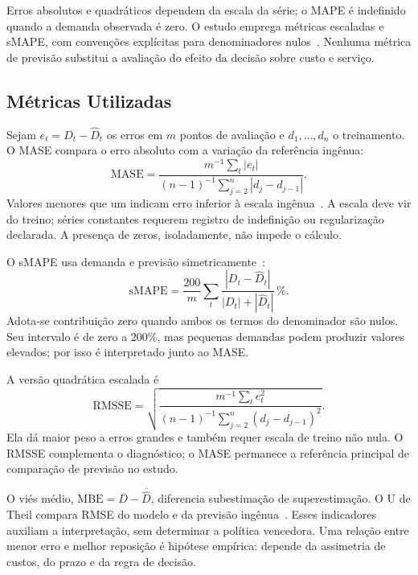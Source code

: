 Erros absolutos e quadráticos dependem da escala da série; o MAPE é indefinido quando a demanda observada é zero. O estudo emprega métricas escaladas e sMAPE, com convenções explícitas para denominadores nulos~\citep{Hyndman2006MASE,Makridakis2020M4Competition}. Nenhuma métrica de previsão substitui a avaliação do efeito da decisão sobre custo e serviço.

\subsection{Métricas Utilizadas}

Sejam $e_t=D_t-\hat D_t$ os erros em $m$ pontos de avaliação e $d_1,\ldots,d_n$ o treinamento. O MASE compara o erro absoluto com a variação da referência ingênua:
\begin{equation}
\mathrm{MASE}=\frac{m^{-1}\sum_t|e_t|}{(n-1)^{-1}\sum_{j=2}^{n}|d_j-d_{j-1}|}.
\label{eq:mase}
\end{equation}
Valores menores que um indicam erro inferior à escala ingênua~\citep{Hyndman2006MASE}. A escala deve vir do treino; séries constantes requerem registro de indefinição ou regularização declarada. A presença de zeros, isoladamente, não impede o cálculo.

O sMAPE usa demanda e previsão simetricamente~\citep{Makridakis1993SMAPE}:
\begin{equation}
\mathrm{sMAPE}=\frac{200}{m}\sum_t\frac{|D_t-\hat D_t|}{|D_t|+|\hat D_t|}\,\%.
\label{eq:smape}
\end{equation}
Adota-se contribuição zero quando ambos os termos do denominador são nulos. Seu intervalo é de zero a 200\%, mas pequenas demandas podem produzir valores elevados; por isso é interpretado junto ao MASE.

A versão quadrática escalada é
\begin{equation}
\mathrm{RMSSE}=\sqrt{\frac{m^{-1}\sum_te_t^2}{(n-1)^{-1}\sum_{j=2}^{n}(d_j-d_{j-1})^2}}.
\label{eq:rmsse}
\end{equation}
Ela dá maior peso a erros grandes e também requer escala de treino não nula. O RMSSE complementa o diagnóstico; o MASE permanece a referência principal de comparação de previsão no estudo.

O viés médio, $\mathrm{MBE}=\overline D-\overline{\hat D}$, diferencia subestimação de superestimação. O U de Theil compara RMSE do modelo e da previsão ingênua~\citep{Theil1966AppliedEconometrics}. Esses indicadores auxiliam a interpretação, sem determinar a política vencedora. Uma relação entre menor erro e melhor reposição é hipótese empírica: depende da assimetria de custos, do prazo e da regra de decisão.

